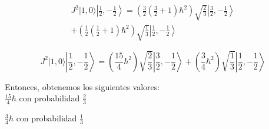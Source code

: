 \begin{solution}
\begin{parts}
  \begin{multline*}
      J^2|1,0\rangle \left|\frac{1}{2},-\frac{1}{2}\right\rangle =\left(\frac{3}{2}\left(\frac{3}{2}+1\right)\hbar ^2\right)\sqrt{\frac{2}{3}}\left|\frac{3}{2},-\frac{1}{2}\right\rangle \\
  +\left(\frac{1}{2}\left(\frac{1}{2}+1\right)\hbar ^2\right)\sqrt{\frac{1}{3}}\left|\frac{1}{2},-\frac{1}{2}\right\rangle
  \end{multline*}
  
  \[J^2|1,0\rangle \left|\frac{1}{2},-\frac{1}{2}\right\rangle =\left(\frac{15}{4}\hbar ^2\right)\sqrt{\frac{2}{3}}\left|\frac{3}{2},-\frac{1}{2}\right\rangle
  +\left(\frac{3}{4}\hbar ^2\right)\sqrt{\frac{1}{3}}\left|\frac{1}{2},-\frac{1}{2}\right\rangle\]
  
  Entonces, obtenemos los siguientes valores:\\
  
  \(\frac{15}{4}\hbar\) { }con probabilidad { }\(\frac{2}{3}\)
  
  \(\frac{3}{4}\hbar\) { }con probabilidad { }\(\frac{1}{3}\)
  
\end{parts}
  
\end{solution}  